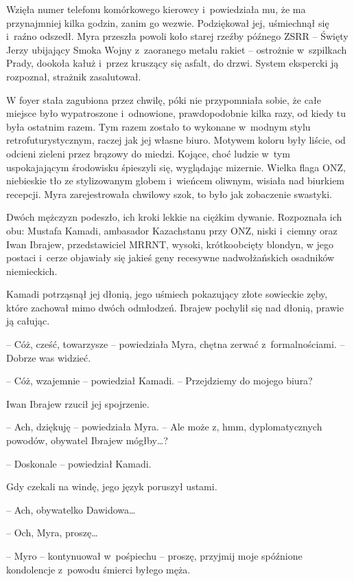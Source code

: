 \documentclass[oneside,polish,11pt,sfheadings]{mwbk}
\begin{document}
Wzięła numer telefonu komórkowego kierowcy i~powiedziała mu, że ma
przynajmniej kilka godzin, zanim go wezwie. Podziękował jej, uśmiechnął
się i~raźno odszedł. Myra przeszła powoli koło starej rzeźby późnego
ZSRR -- Święty Jerzy ubijający Smoka Wojny z~zaoranego metalu rakiet -- ostrożnie w~szpilkach Prady, dookoła kałuż i~przez kruszący się asfalt,
do drzwi. System ekspercki ją rozpoznał, strażnik zasalutował.

W foyer stała zagubiona przez chwilę, póki nie przypomniała sobie, że
całe miejsce było wypatroszone i~odnowione, prawdopodobnie kilka razy,
od kiedy tu była ostatnim razem. Tym razem zostało to wykonane w~modnym
stylu retrofuturystycznym, raczej jak jej własne biuro. Motywem koloru
były liście, od odcieni zieleni przez brązowy do miedzi. Kojące, choć
ludzie w~tym uspokajającym środowisku śpieszyli się, wyglądając
mizernie. Wielka flaga ONZ, niebieskie tło ze stylizowanym globem i~wieńcem oliwnym, wisiała nad biurkiem recepcji. Myra zarejestrowała
chwilowy szok, to było jak zobaczenie swastyki.

Dwóch mężczyzn podeszło, ich kroki lekkie na ciężkim dywanie. Rozpoznała
ich obu: Mustafa Kamadi, ambasador Kazachstanu przy ONZ, niski i~ciemny
oraz Iwan Ibrajew, przedstawiciel MRRNT, wysoki, krótkoobcięty blondyn,
w jego postaci i~cerze objawiały się jakieś geny recesywne
nadwołżańskich osadników niemieckich.

Kamadi potrząsnął jej dłonią, jego uśmiech pokazujący złote sowieckie
zęby, które zachował mimo dwóch odmłodzeń. Ibrajew pochylił się nad
dłonią, prawie ją całując.

-- Cóż, cześć, towarzysze -- powiedziała Myra, chętna zerwać z~formalnościami. -- Dobrze was widzieć.

-- Cóż, wzajemnie -- powiedział Kamadi. -- Przejdziemy do mojego biura?

Iwan Ibrajew rzucił jej spojrzenie.

-- Ach, dziękuję -- powiedziała Myra. -- Ale może z, hmm, dyplomatycznych
powodów, obywatel Ibrajew mógłby\ldots?

-- Doskonale -- powiedział Kamadi.

Gdy czekali na windę, jego język poruszył ustami. 

-- Ach, obywatelko
Dawidowa\ldots

-- Och, Myra, proszę\ldots

-- Myro -- kontynuował w~pośpiechu -- proszę, przyjmij moje spóźnione
kondolencje z~powodu śmierci byłego męża.
\end{document}

